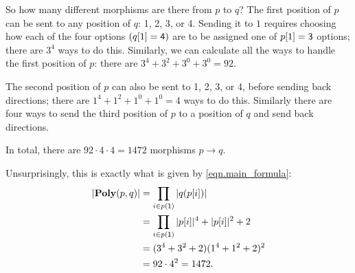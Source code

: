 \documentclass[Book-Poly]{subfiles}
\begin{document}
\begin{example}
So how many different morphisms are there from $p$ to $q$? The first position of $p$ can be sent to any position of $q$: 1, 2, 3, or 4. Sending it to $1$ requires choosing how each of the four options $(q[1]=\textsf{4})$ are to be assigned one of $p[1]=\textsf{3}$ options; there are $3^4$ ways to do this. Similarly, we can calculate all the ways to handle the first position of $p$: there are $3^4+3^2+3^0+3^0=92$. 

The second position of $p$ can also be sent to 1, 2, 3, or 4, before sending back directions; there are $1^4+1^2+1^0+1^0=4$ ways to do this. 
Similarly there are four ways to send the third position of $p$ to a position of $q$ and send back directions.

In total, there are $92 \cdot 4 \cdot 4=1472$ morphisms $p\to q$.

Unsurprisingly, this is exactly what is given by \eqref{eqn.main_formula}:
\begin{align*}
    |\textbf{Poly}(p, q)| &= \prod_{i \in p(\textsf{1})} |q(p[i])| \\
    &= \prod_{i \in p(\textsf{1})} |p[i]|^4 + |p[i]|^2 + 2 \\
    &= (3^4 + 3^2 + 2)(1^4 + 1^2 + 2)^2 \\
    &= 92 \cdot 4^2 = 1472.
\end{align*}
\end{example}
\end{document}
